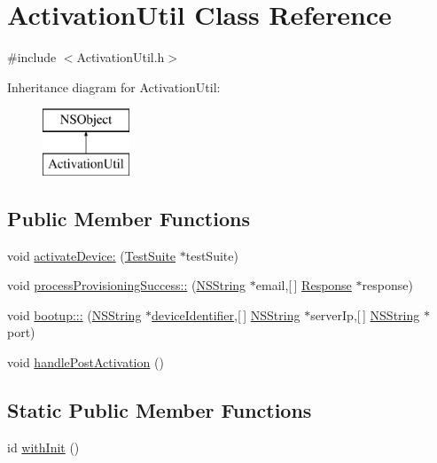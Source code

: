 \hypertarget{interface_activation_util}{
\section{\-Activation\-Util \-Class \-Reference}
\label{interface_activation_util}
}


{\ttfamily \#include $<$\-Activation\-Util.\-h$>$}

\-Inheritance diagram for \-Activation\-Util\-:\begin{figure}[H]
\begin{center}
\leavevmode
\includegraphics[height=2.000000cm]{interface_activation_util}
\end{center}
\end{figure}
\subsection*{\-Public \-Member \-Functions}
\begin{DoxyCompactItemize}
\item 
void \hyperlink{interface_activation_util_ab29ad171327263ac5eb0d706e51277e8}{activate\-Device\-:} (\hyperlink{interface_test_suite}{\-Test\-Suite} $\ast$test\-Suite)
\item 
void \hyperlink{interface_activation_util_a850a35be430a608b4eaf83c5b9ce348f}{process\-Provisioning\-Success\-::} (\hyperlink{class_n_s_string}{\-N\-S\-String} $\ast$email,\mbox{[}$\,$\mbox{]} \hyperlink{interface_response}{\-Response} $\ast$response)
\item 
void \hyperlink{interface_activation_util_ad68ac1f345e6c2573b40cba871cf64a0}{bootup\-:::} (\hyperlink{class_n_s_string}{\-N\-S\-String} $\ast$\hyperlink{_activation_util_8m_a3a7765336d2edc6b3dce304e4f59c2ce}{device\-Identifier},\mbox{[}$\,$\mbox{]} \hyperlink{class_n_s_string}{\-N\-S\-String} $\ast$server\-Ip,\mbox{[}$\,$\mbox{]} \hyperlink{class_n_s_string}{\-N\-S\-String} $\ast$port)
\item 
void \hyperlink{interface_activation_util_a932cc9f75e48c2e95cc4deb7464d75a9}{handle\-Post\-Activation} ()
\end{DoxyCompactItemize}
\subsection*{\-Static \-Public \-Member \-Functions}
\begin{DoxyCompactItemize}
\item 
id \hyperlink{interface_activation_util_a0b581e52b17371988c290d8caafe28d8}{with\-Init} ()
\end{DoxyCompactItemize}


